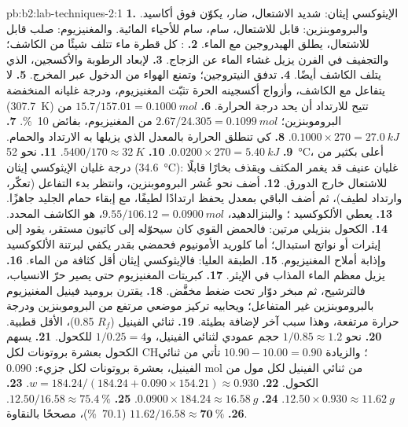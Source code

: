 \begin{solution}{pb:b2:lab-techniques-2:1}
\textbf{1.} الإيثوكسي إيثان: شديد الاشتعال، ضار، يكوّن فوق أكاسيد. والبروموبنزين: قابل للاشتعال، سام،
سام للأحياء المائية. والمغنيزيوم: صلب قابل للاشتعال، يطلق الهيدروجين مع الماء.
\textbf{2.} : كل قطرة ماء تتلف شيئًا من الكاشف؛ والتجفيف في الفرن
يزيل غشاء الماء عن الزجاج.
\textbf{3.} لإبعاد الرطوبة والأكسجين، الذي يتلف الكاشف أيضًا.
\textbf{4.} تدفق النيتروجين؛ وتمنع الهواء من الدخول عبر المخرج.
\textbf{5.} لا يتفاعل مع الكاشف، وأزواج أكسجينه الحرة تثبّت المغنيزيوم، 
ودرجة غليانه المنخفضة (\qty{307.7}{K}) تتيح للارتداد أن يحد درجة الحرارة.
\textbf{6.} $15.7/157.01 = \qty{0.1000}{mol}$ من البروموبنزين؛ $2.67/24.305 = \qty{0.1099}{mol}$ من المغنيزيوم،
بفائض 10~\%.
\textbf{7.} $0.1000 \times 270 = \qty{27.0}{kJ}$.
\textbf{8.} كي تنطلق الحرارة بالمعدل الذي يزيلها به الارتداد والحمام.
\textbf{9.} $0.0200 \times 270 = \qty{5.40}{kJ}$.
\textbf{10.} $5400/170 \approx \qty{32}{K}$.
\textbf{11.} نحو \qty{52}{\degreeCelsius}، أعلى بكثير من درجة غليان الإيثوكسي إيثان
(\qty{34.6}{\degreeCelsius}): غليان عنيف قد يغمر المكثف ويقذف بخارًا قابلًا للاشتعال
خارج الدورق.
\textbf{12.} أضف نحو عُشر البروموبنزين، وانتظر بدء التفاعل (تعكّر، وارتداد
لطيف)، ثم أضف الباقي بمعدل يحفظ ارتدادًا لطيفًا، مع إبقاء حمام الجليد جاهزًا.
\textbf{13.}  يعطي الألكوكسيد ؛ والبنزالدهيد،
$9.55/106.12 = \qty{0.0900}{mol}$، هو الكاشف المحدد.
\textbf{14.} الكحول بنزيلي مرتين: فالحمض القوي كان سيحوّله إلى كاتيون مستقر،
يقود إلى إيثرات أو نواتج استبدال؛ أما كلوريد الأمونيوم فحمضي بقدر يكفي لبرتنة الألكوكسيد
وإذابة أملاح المغنيزيوم.
\textbf{15.} الطبقة العليا: فالإيثوكسي إيثان أقل كثافة من الماء.
\textbf{16.} يزيل معظم الماء المذاب في الإيثر.
\textbf{17.} كبريتات المغنيزيوم حتى يصير حرّ الانسياب، فالترشيح، ثم مبخر دوّار تحت ضغط
مخفَّض.
\textbf{18.} يقترن بروميد فينيل المغنيزيوم بالبروموبنزين غير المتفاعل؛ ويحابيه تركيز موضعي مرتفع من
البروموبنزين ودرجة حرارة مرتفعة، وهذا سبب آخر لإضافة بطيئة.
\textbf{19.} ثنائي الفينيل ($R_f$ 0.85)، الأقل قطبية.
\textbf{20.} نحو $1/0.85 \approx 1.2$ حجم عمودي لثنائي الفينيل، و$1/0.25 = 4$ للكحول.
\textbf{21.} يسهم الكحول بعشرة بروتونات  لكل CH؛ والزيادة $10.90 - 10.00 = 0.90$ تأتي من
ثنائي الفينيل، بعشرة بروتونات لكل جزيء: 0.090 mol من ثنائي الفينيل لكل مول من الكحول.
\textbf{22.} $w = 184.24/(184.24 + 0.090 \times 154.21) \approx 0.930$.
\textbf{23.} $12.50 \times 0.930 \approx \qty{11.62}{g}$.
\textbf{24.} $0.0900 \times 184.24 \approx \qty{16.58}{g}$.
\textbf{25.} $12.50/16.58 \approx 75.4~\%$.
\textbf{26.} $11.62/16.58 \approx \boldsymbol{70~\%}$ (70.1~\%)، مصححًا بالنقاوة.
\end{solution}
